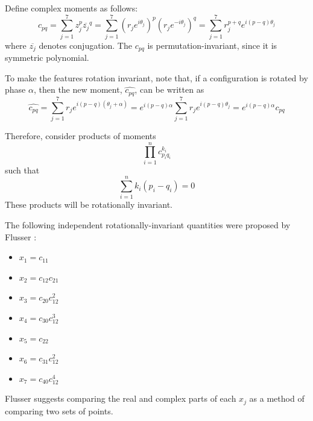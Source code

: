 Define complex moments as follows:
\begin{equation}
c_{pq}=\sum_{j=1}^{7}z_{j}^{p}\overline{z_{j}}^{q}=\sum_{j=1}^{7}\left(r_{j}e^{i\theta_j}\right)^{p}\left(r_{j}e^{-i\theta_j}\right)^{q}=\sum_{j=1}^{7}r_{j}^{p+q}e^{i(p-q)\theta_j}
\end{equation}
where $\overline{z_j}$ denotes conjugation. The $c_{pq}$ is permutation-invariant, since it is symmetric polynomial.

To make the features rotation invariant, note that, if a configuration is rotated by phase $\alpha$, then the new moment, $\hat{c_{pq}}$, can be written as
\begin{equation}
\hat{c_{pq}}=\sum_{j=1}^{7}r_{j}e^{i(p-q)(\theta_j+\alpha)}=e^{i(p-q)\alpha}\sum_{j=1}^{7}r_{j}e^{i(p-q)\theta_j}=e^{i(p-q)\alpha}c_{pq}
\end{equation}

Therefore, consider products of moments
\begin{equation}
\prod_{i=1}^{n}c_{p_{i}q_{i}}^{k_i}
\end{equation}
such that 
\begin{equation}
\sum_{i=1}^{n}k_i(p_i-q_i)=0
\end{equation}
These products will be rotationally invariant.

The following independent rotationally-invariant quantities were proposed by Flusser \cite{flusser2000independence}:
\begin{itemize}
\item $x_1=c_{11}$
\item $x_2=c_{12}c_{21}$
\item $x_3=c_{20}c_{12}^2$
\item $x_4=c_{30}c_{12}^3$
\item $x_5=c_{22}$
\item $x_6=c_{31}c_{12}^2$
\item $x_7=c_{40}c_{12}^{4}$
\end{itemize}
Flusser suggests comparing the real and complex parts of each $x_{j}$ as a method of comparing two sets of points.

